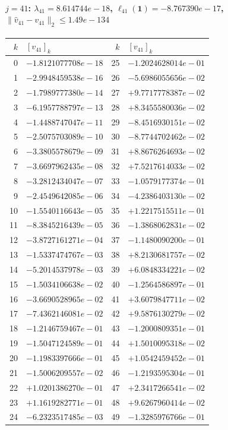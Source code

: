 \documentclass[11pt]{article}
\begin{document}
\paragraph{$j = 41$: $\lambda_{41} = 8.614744e-18$, \quad $\ell_{41}(\mathbf{1}) = -8.767390e-17$, \quad $\|\hat{v}_{41} - v_{41}\|_2 \leq 1.49e-134$}
\begin{center}
{\footnotesize
\begin{tabular}{r@{\;\;}l@{\quad}r@{\;\;}l}
\toprule
$k$ & $[v_{41}]_k$ & $k$ & $[v_{41}]_k$ \\
\midrule
0 & $-1.8121077708e-18$ & 25 & $-1.2024628014e-01$ \\
1 & $-2.9948459538e-16$ & 26 & $-5.6986055656e-02$ \\
2 & $-1.7989777380e-14$ & 27 & $+9.7717778387e-02$ \\
3 & $-6.1957788797e-13$ & 28 & $+8.3455580036e-02$ \\
4 & $-1.4488747047e-11$ & 29 & $-8.4516930151e-02$ \\
5 & $-2.5075703089e-10$ & 30 & $-8.7744702462e-02$ \\
6 & $-3.3805578679e-09$ & 31 & $+8.8676264693e-02$ \\
7 & $-3.6697962435e-08$ & 32 & $+7.5217614033e-02$ \\
8 & $-3.2812434047e-07$ & 33 & $-1.0579177374e-01$ \\
9 & $-2.4549642085e-06$ & 34 & $-4.2386403130e-02$ \\
10 & $-1.5540116643e-05$ & 35 & $+1.2217515511e-01$ \\
11 & $-8.3845216439e-05$ & 36 & $-1.3868062831e-02$ \\
12 & $-3.8727161271e-04$ & 37 & $-1.1480090200e-01$ \\
13 & $-1.5337474767e-03$ & 38 & $+8.2130681757e-02$ \\
14 & $-5.2014537978e-03$ & 39 & $+6.0848334221e-02$ \\
15 & $-1.5034106638e-02$ & 40 & $-1.2564586897e-01$ \\
16 & $-3.6690528965e-02$ & 41 & $+3.6079847711e-02$ \\
17 & $-7.4362146081e-02$ & 42 & $+9.5876130279e-02$ \\
18 & $-1.2146759467e-01$ & 43 & $-1.2000809351e-01$ \\
19 & $-1.5047124589e-01$ & 44 & $+1.5010095318e-02$ \\
20 & $-1.1983397666e-01$ & 45 & $+1.0542459452e-01$ \\
21 & $-1.5006209557e-02$ & 46 & $-1.2193595304e-01$ \\
22 & $+1.0201386270e-01$ & 47 & $+2.3417266541e-02$ \\
23 & $+1.1619282771e-01$ & 48 & $+9.6267960414e-02$ \\
24 & $-6.2323517485e-03$ & 49 & $-1.3285976766e-01$ \\
\bottomrule
\end{tabular}
}
\end{center}
\end{document}
